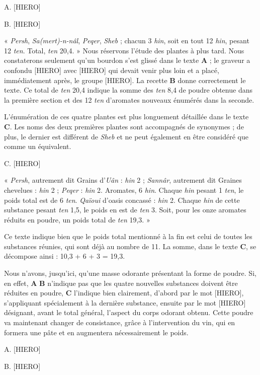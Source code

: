 \documentclass[a4paper, 11pt, oneside]{article}
\begin{document}
A. [HIERO]

B. [HIERO]

« \emph{Persh}, \emph{Sa(mert)-n-nâl}, \emph{Peqer}, \emph{Sheb} ; chacun 3 \emph{hin}, soit en tout 12 \emph{hin}, pesant 12 \emph{ten}. Total, \emph{ten} 20,4. » Nous réservons l'étude des plantes à plus tard. Nous constaterons seulement qu'un bourdon s'est glissé dans le texte \textbf{A} ; le graveur a confondu [HIERO] avec [HIERO] qui devait venir plus loin et a placé, immédiatement après, le groupe [HIERO]. La recette \textbf{B} donne correctement le texte. Ce total de \emph{ten} 20,4 indique la somme des \emph{ten} 8,4 de poudre obtenue dans la première section et des 12 \emph{ten} d'aromates nouveaux énumérés dans la seconde.

L'énumération de ces quatre plantes est plus longuement détaillée dans le texte \textbf{C}. Les noms des deux premières plantes sont accompagnés de synonymes ; de plus, le dernier est différent de \emph{Sheb} et ne peut également en être considéré que comme un équivalent.

C. [HIERO]

« \emph{Persh}, autrement dit Grains d'\emph{Uân} : \emph{hin} 2 ; \emph{Sannâr}, autrement dit Graines chevelues : \emph{hin} 2 ; \emph{Peqer} : \emph{hin} 2. Aromates, 6 \emph{hin}. Chaque \emph{hin} pesant 1 \emph{ten}, le poids total est de 6 \emph{ten}. \emph{Qaïoui} d'oasis concassé : \emph{hin} 2. Chaque \emph{hin} de cette substance pesant \emph{ten} 1,5, le poids en est de \emph{ten} 3. Soit, pour les onze aromates réduits en poudre, un poids total de \emph{ten} 19,3. »

Ce texte indique bien que le poids total mentionné à la fin est celui de toutes les substances réunies, qui sont déjà au nombre de 11. La somme, dans le texte \textbf{C}, se décompose ainsi : 10,3 + 6 + 3 = 19,3.

Nous n'avons, jusqu'ici, qu'une masse odorante présentant la forme de poudre. Si, en effet, \textbf{A} \textbf{B} n'indique pas que les quatre nouvelles substances doivent être réduites en poudre, \textbf{C} l'indique bien clairement, d'abord par le mot [HIERO], s'appliquant spécialement à la dernière substance, ensuite par le mot [HIERO] désignant, avant le total général, l'aspect du corps odorant obtenu. Cette poudre va maintenant changer de consistance, grâce à l'intervention du vin, qui en formera une pâte et en augmentera nécessairement le poids.

A. [HIERO]

B. [HIERO]
\end{document}
